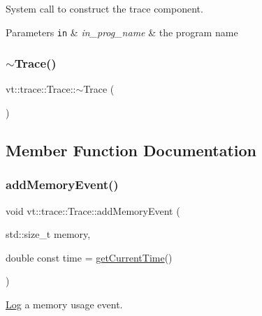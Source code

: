 System call to construct the trace component. 


\begin{DoxyParams}[1]{Parameters}
\mbox{\tt in}  & {\em in\+\_\+prog\+\_\+name} & the program name \\
\hline
\end{DoxyParams}
\mbox{\label{structvt_1_1trace_1_1_trace_a80b3426aed07572525ef4834b0c4dedd}} 
\subsubsection{\texorpdfstring{$\sim$\+Trace()}{~Trace()}}
{\footnotesize\ttfamily vt\+::trace\+::\+Trace\+::$\sim$\+Trace (\begin{DoxyParamCaption}{ }\end{DoxyParamCaption})\hspace{0.3cm}{\ttfamily [virtual]}}



\subsection{Member Function Documentation}
\mbox{\label{structvt_1_1trace_1_1_trace_abc497f6fa641ac1c2c20889815b06dbc}} 
\subsubsection{\texorpdfstring{add\+Memory\+Event()}{addMemoryEvent()}}
{\footnotesize\ttfamily void vt\+::trace\+::\+Trace\+::add\+Memory\+Event (\begin{DoxyParamCaption}\item[{std\+::size\+\_\+t}]{memory,  }\item[{double const}]{time = {\ttfamily \hyperlink{structvt_1_1trace_1_1_trace_lite_ad1d8159d645a3b7047ce3f2e0c080f8d}{get\+Current\+Time}()} }\end{DoxyParamCaption})}



\hyperlink{structvt_1_1trace_1_1_log}{Log} a memory usage event. 


